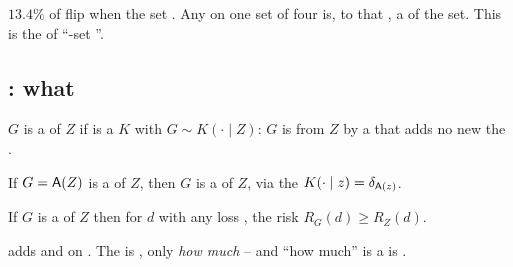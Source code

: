 \begin{corollary}
\label{cor:iia}
$13.4\%$ of   flip when the  set . Any 
  on one set of four  is, to that , a  of
the set. This is the   of ``-set ''.
\end{corollary}

\subsection{: what   }

\begin{definition}[Garbling]
$G$ is a \emph{} of $Z$ if  is a   $K$ with
$G \sim K(\cdot \mid Z)$: $G$ is  from $Z$ by a  that adds no new
  the .
\end{definition}

\begin{lemma}
\label{lem:garble}
If $G = \mathsf{A}(Z)$ is a   of $Z$, then $G$ is a  of
$Z$, via the   $K(\cdot\mid z) = \delta_{\mathsf{A}(z)}$.
\end{lemma}

\begin{theorem}
\label{thm:garble}
If $G$ is a  of $Z$ then for \emph{}   $d$ with any
loss , the   risk  $R_G(d) \ge R_Z(d)$.
\end{theorem}

\begin{corollary}
  adds  and   on   .
The  is  \emph{}, only \emph{how much} -- and ``how much'' is
  a   is .
\end{corollary}

